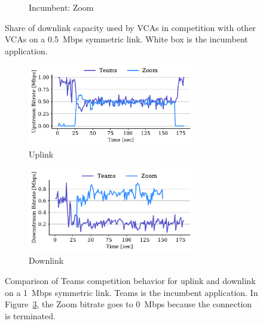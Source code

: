 \begin{figure}[t!]
\begin{subfigure}[t]{.33\textwidth}
    \caption{Incumbent: Zoom}
    \label{fig:zoom-dl-boxplot-0.5}
\end{subfigure}
\caption{Share of downlink capacity used by VCAs in competition with other VCAs on a 0.5~Mbps symmetric link. White box is the incumbent application.}
\label{fig:dnld-boxplot}
\end{figure}

\begin{figure}[t!]
\centering
\begin{subfigure}[t]{.5\textwidth}
    \centering
    \includegraphics[width=0.8\textwidth]{figures/comp_ts/teams_zoom_1_ul_r2.pdf}
    \caption{Uplink}
    \label{fig:teams-zoom-up-1}
\end{subfigure}\hfill
\begin{subfigure}[t]{.5\textwidth}
    \centering
    \includegraphics[width=0.8\textwidth]{figures/comp_ts/teams_zoom_1_dl_r2.pdf}
    \caption{Downlink}
    \label{fig:teams-zoom-down-1}
\end{subfigure}
\caption{Comparison of Teams competition behavior for uplink and downlink on a
    1~Mbps symmetric link. Teams is the incumbent application. In
    Figure~\ref{fig:teams-zoom-up-1}, the Zoom bitrate goes to 0~Mbps because
    the connection is terminated.}
\label{fig:teams-zoom-1}
\end{figure}


